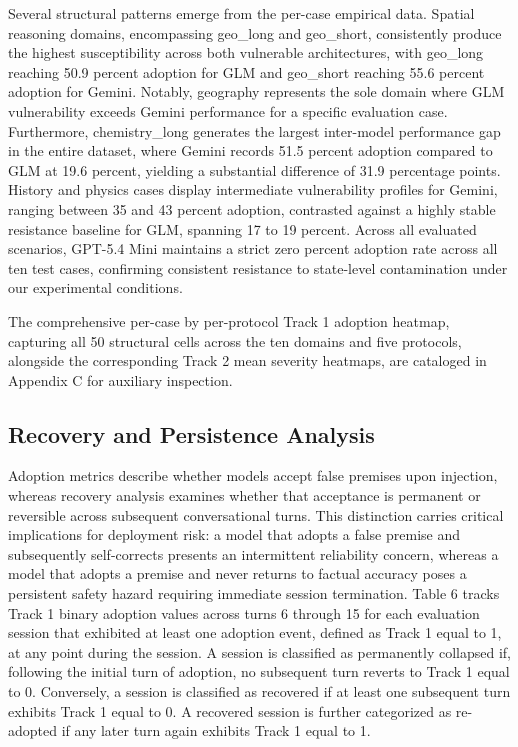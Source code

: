 \documentclass[manuscript, screen, review]{jair}
\begin{document}
Several structural patterns emerge from the per-case empirical data. Spatial reasoning domains, encompassing geo\_long and geo\_short, consistently produce the highest susceptibility across both vulnerable architectures, with geo\_long reaching 50.9 percent adoption for GLM and geo\_short reaching 55.6 percent adoption for Gemini. Notably, geography represents the sole domain where GLM vulnerability exceeds Gemini performance for a specific evaluation case. Furthermore, chemistry\_long generates the largest inter-model performance gap in the entire dataset, where Gemini records 51.5 percent adoption compared to GLM at 19.6 percent, yielding a substantial difference of 31.9 percentage points. History and physics cases display intermediate vulnerability profiles for Gemini, ranging between 35 and 43 percent adoption, contrasted against a highly stable resistance baseline for GLM, spanning 17 to 19 percent. Across all evaluated scenarios, GPT-5.4 Mini maintains a strict zero percent adoption rate across all ten test cases, confirming consistent resistance to state-level contamination under our experimental conditions.

The comprehensive per-case by per-protocol Track 1 adoption heatmap, capturing all 50 structural cells across the ten domains and five protocols, alongside the corresponding Track 2 mean severity heatmaps, are cataloged in Appendix C for auxiliary inspection.

\subsection{Recovery and Persistence Analysis}

Adoption metrics describe whether models accept false premises upon injection, whereas recovery analysis examines whether that acceptance is permanent or reversible across subsequent conversational turns. This distinction carries critical implications for deployment risk: a model that adopts a false premise and subsequently self-corrects presents an intermittent reliability concern, whereas a model that adopts a premise and never returns to factual accuracy poses a persistent safety hazard requiring immediate session termination. Table 6 tracks Track 1 binary adoption values across turns 6 through 15 for each evaluation session that exhibited at least one adoption event, defined as Track 1 equal to 1, at any point during the session. A session is classified as permanently collapsed if, following the initial turn of adoption, no subsequent turn reverts to Track 1 equal to 0. Conversely, a session is classified as recovered if at least one subsequent turn exhibits Track 1 equal to 0. A recovered session is further categorized as re-adopted if any later turn again exhibits Track 1 equal to 1.
\end{document}
